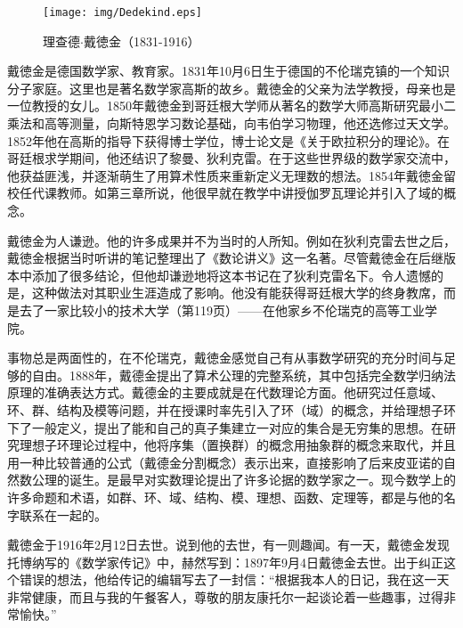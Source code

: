 \documentclass{article}
\begin{document}
\begin{wrapfigure}{L}{0.4\textwidth}
 \centering
 \texttt{[image: img/Dedekind.eps]}
 \captionsetup{labelformat=empty}
 \caption{理查德$\cdot$戴徳金（1831-1916）}
 \label{fig:Dedekind}
\end{wrapfigure}

戴徳金是德国数学家、教育家。1831年10月6日生于德国的不伦瑞克镇的一个知识分子家庭。这里也是著名数学家高斯的故乡。戴徳金的父亲为法学教授，母亲也是一位教授的女儿。1850年戴徳金到哥廷根大学师从著名的数学大师高斯研究最小二乘法和高等测量，向斯特恩学习数论基础，向韦伯学习物理，他还选修过天文学。1852年他在高斯的指导下获得博士学位，博士论文是《关于欧拉积分的理论》。在哥廷根求学期间，他还结识了黎曼、狄利克雷。在于这些世界级的数学家交流中，他获益匪浅，并逐渐萌生了用算术性质来重新定义无理数的想法。1854年戴徳金留校任代课教师。如第三章所说，他很早就在教学中讲授伽罗瓦理论并引入了域的概念。

戴徳金为人谦逊。他的许多成果并不为当时的人所知。例如在狄利克雷去世之后，戴徳金根据当时听讲的笔记整理出了《数论讲义》这一名著。尽管戴徳金在后继版本中添加了很多结论，但他却谦逊地将这本书记在了狄利克雷名下。令人遗憾的是，这种做法对其职业生涯造成了影响。他没有能获得哥廷根大学的终身教席，而是去了一家比较小的技术大学（\cite{Stepanov}第119页）——在他家乡不伦瑞克的高等工业学院。

事物总是两面性的，在不伦瑞克，戴徳金感觉自己有从事数学研究的充分时间与足够的自由。1888年，戴德金提出了算术公理的完整系统，其中包括完全数学归纳法原理的准确表达方式。戴德金的主要成就是在代数理论方面。他研究过任意域、环、群、结构及模等问题，并在授课时率先引入了环（域）的概念，并给理想子环下了一般定义，提出了能和自己的真子集建立一对应的集合是无穷集的思想。在研究理想子环理论过程中，他将序集（置换群）的概念用抽象群的概念来取代，并且用一种比较普通的公式（戴德金分割概念）表示出来，直接影响了后来皮亚诺的自然数公理的诞生。是最早对实数理论提出了许多论据的数学家之一。现今数学上的许多命题和术语，如群、环、域、结构、模、理想、函数、定理等，都是与他的名字联系在一起的。

戴徳金于1916年2月12日去世。说到他的去世，有一则趣闻。有一天，戴徳金发现托博纳写的《数学家传记》中，赫然写到：1897年9月4日戴徳金去世。出于纠正这个错误的想法，他给传记的编辑写去了一封信：“根据我本人的日记，我在这一天非常健康，而且与我的午餐客人，尊敬的朋友康托尔一起谈论着一些趣事，过得非常愉快。”\cite{HanXueTao16}
\end{document}
